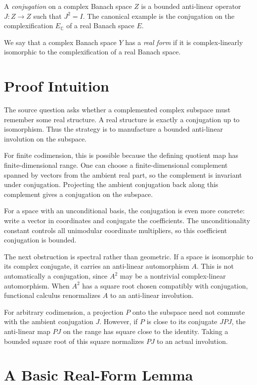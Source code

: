 \documentclass[11pt]{article}
\theoremstyle{remark}
\newcommand{\C}{\mathbb C}
\begin{document}
A \emph{conjugation} on a complex Banach space \(Z\) is a bounded anti-linear
operator \(J:Z\to Z\) such that \(J^2=I\).  The canonical example is the
conjugation on the complexification \(E_\C\) of a real Banach space \(E\).

We say that a complex Banach space \(Y\) has a \emph{real form} if it is
complex-linearly isomorphic to the complexification of a real Banach space.

\section{Proof Intuition}

The source question asks whether a complemented complex subspace must remember
some real structure.  A real structure is exactly a conjugation up to
isomorphism.  Thus the strategy is to manufacture a bounded anti-linear
involution on the subspace.

For finite codimension, this is possible because the defining quotient map has
finite-dimensional range.  One can choose a finite-dimensional complement
spanned by vectors from the ambient real part, so the complement is invariant
under conjugation.  Projecting the ambient conjugation back along this
complement gives a conjugation on the subspace.

For a space with an unconditional basis, the conjugation is even more concrete:
write a vector in coordinates and conjugate the coefficients.  The
unconditionality constant controls all unimodular coordinate multipliers, so
this coefficient conjugation is bounded.

The next obstruction is spectral rather than geometric.  If a space is
isomorphic to its complex conjugate, it carries an anti-linear automorphism
\(A\).  This is not automatically a conjugation, since \(A^2\) may be a
nontrivial complex-linear automorphism.  When \(A^2\) has a square root chosen
compatibly with conjugation, functional calculus renormalizes \(A\) to an
anti-linear involution.

For arbitrary codimension, a projection \(P\) onto the subspace need not
commute with the ambient conjugation \(J\).  However, if \(P\) is close to its
conjugate \(JPJ\), the anti-linear map \(PJ\) on the range has square close to
the identity.  Taking a bounded square root of this square normalizes \(PJ\)
to an actual involution.

\section{A Basic Real-Form Lemma}
\end{document}

